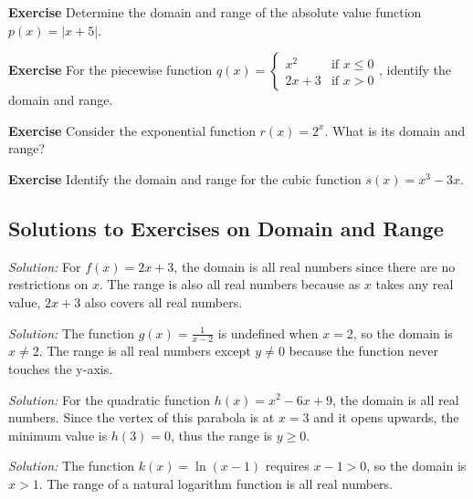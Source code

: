 \documentclass[a4paper,12pt]{book}
\newenvironment{exercise}[1][]
  {\par\medskip\noindent\textbf{Exercise #1} \rmfamily}
  {\medskip}
\newenvironment{solution}[1][]
{\par\noindent\textit{Solution:} \rmfamily}{\medskip}
\begin{document}
\begin{exercise}
Determine the domain and range of the absolute value function \( p(x) = |x + 5| \).
\end{exercise}

\begin{exercise}
For the piecewise function \( q(x) = \begin{cases} x^2 & \text{if } x \leq 0 \\ 2x + 3 & \text{if } x > 0 \end{cases} \), identify the domain and range.
\end{exercise}

\begin{exercise}
Consider the exponential function \( r(x) = 2^x \). What is its domain and range?
\end{exercise}

\begin{exercise}
Identify the domain and range for the cubic function \( s(x) = x^3 - 3x \).
\end{exercise}

\subsection{Solutions to Exercises on Domain and Range}

\begin{solution}[1]
For \( f(x) = 2x + 3 \), the domain is all real numbers since there are no restrictions on \( x \). The range is also all real numbers because as \( x \) takes any real value, \( 2x + 3 \) also covers all real numbers.
\end{solution}

\begin{solution}[2]
The function \( g(x) = \frac{1}{x - 2} \) is undefined when \( x = 2 \), so the domain is \( x \neq 2 \). The range is all real numbers except \( y \neq 0 \) because the function never touches the y-axis.
\end{solution}

\begin{solution}[3]
For the quadratic function \( h(x) = x^2 - 6x + 9 \), the domain is all real numbers. Since the vertex of this parabola is at \( x = 3 \) and it opens upwards, the minimum value is \( h(3) = 0 \), thus the range is \( y \geq 0 \).
\end{solution}

\begin{solution}[4]
The function \( k(x) = \ln(x - 1) \) requires \( x - 1 > 0 \), so the domain is \( x > 1 \). The range of a natural logarithm function is all real numbers.
\end{solution}
\end{document}
